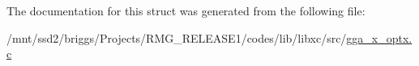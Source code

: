 The documentation for this struct was generated from the following file\-:\begin{DoxyCompactItemize}
\item 
/mnt/ssd2/briggs/\-Projects/\-R\-M\-G\-\_\-\-R\-E\-L\-E\-A\-S\-E1/codes/lib/libxc/src/\hyperlink{gga__x__optx_8c}{gga\-\_\-x\-\_\-optx.\-c}\end{DoxyCompactItemize}
